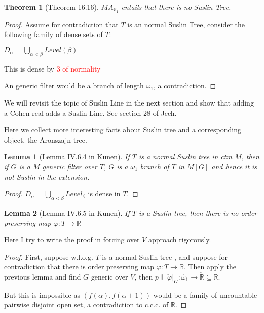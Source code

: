 \documentclass{article}
\newtheorem{lemma}{Lemma}
\newtheorem{theorem}{Theorem}
\begin{document}
\begin{theorem}[Theorem 16.16]
    $MA_{\aleph_1}$ entails that there is no Suslin Tree.
\end{theorem}

\begin{proof}
    Assume for contradiction that $T$ is an normal Suslin Tree, consider the following family of dense sets of $T$: 

    $D_\alpha = \bigcup_{\alpha<\beta}Level(\beta)$

    This is dense by \textcolor{red}{3 of normality}

    An generic filter would be a branch of length $\omega_1$, a contradiction.
\end{proof}

We will revisit the topic of Suslin Line in the next section and show that adding a Cohen real adds a Suslin Line. See section 28 of Jech.

Here we collect more interesting facts about Suslin tree and a corresponding object, the Aronszajn tree.

\begin{lemma}[Lemma IV.6.4 in Kunen]
    If $T$ is a normal Suslin tree in ctm $M$, then if $G$ is a $M$ generic filter over $T$, $G$ is a $\omega_1$ branch of $T$ in $M[G]$ and hence it is not Suslin in the extension.
\end{lemma}

\begin{proof}
    $D_\alpha = \bigcup_{\alpha<\beta}Level_\beta$ is dense in $T$.
\end{proof}

\begin{lemma}[Lemma IV.6.5 in Kunen]
    If $T$ is a Suslin tree, then there is no order preserving map $\varphi: T\to \mathbb{R}$
\end{lemma}

Here I try to write the proof in forcing over $V$ approach rigorously. 

\begin{proof}
    First, suppose w.l.o.g. $T$ is a normal Suslin tree , and suppose for contradiction that there is order preserving map $\varphi: T\to \mathbb{R}$. Then apply the previous lemma and find $G$ generic over $V$, then $p \Vdash \check{\varphi}|_{\dot{G}}: \check{\omega_1}\to \check{\mathbb{R}}\subseteq \mathbb{R}$.
    
    But this is impossible as $(f(\alpha),f(\alpha+1))$ would be a family of uncountable pairwise disjoint open set, a contradiction to c.c.c. of $\mathbb{R}$.
\end{proof}
\end{document}

